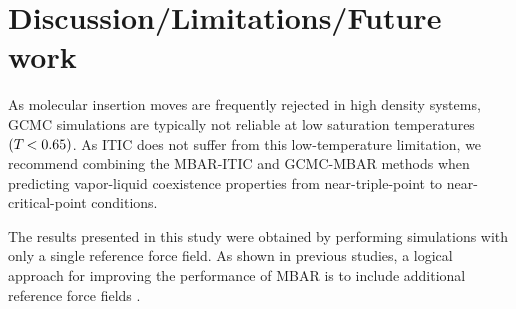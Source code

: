 \documentclass[journal=jced,manuscript=article]{achemso}
\begin{document}

\section{Discussion/Limitations/Future work} \label{sec: Discussion}

As molecular insertion moves are frequently rejected in high density systems, GCMC simulations are typically not reliable at low saturation temperatures $(T_{\rm } < 0.65)$. As ITIC does not suffer from this low-temperature limitation, we recommend combining the MBAR-ITIC and GCMC-MBAR methods when predicting vapor-liquid coexistence properties from near-triple-point to near-critical-point conditions.

The results presented in this study were obtained by performing simulations with only a single reference force field. As shown in previous studies, a logical approach for improving the performance of MBAR is to include additional reference force fields \cite{Postdoc_1,Postdoc_2}.


\end{document}
